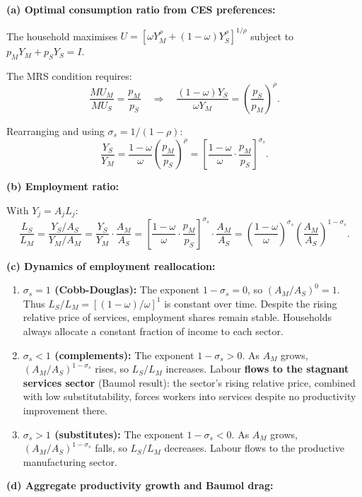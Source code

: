 \documentclass[a4paper,11pt]{article}
\begin{document}
\begin{answerbox}
\textbf{(a) Optimal consumption ratio from CES preferences:}

The household maximises $U = [\omega Y_M^\rho + (1-\omega)Y_S^\rho]^{1/\rho}$ subject to $p_M Y_M + p_S Y_S = I$.

The MRS condition requires:
\[
    \frac{MU_M}{MU_S} = \frac{p_M}{p_S}
    \quad\Longrightarrow\quad
    \frac{(1-\omega)Y_S}{\omega Y_M} = \left(\frac{p_S}{p_M}\right)^{\rho}.
\]

Rearranging and using $\sigma_s = 1/(1-\rho)$:
\[
    \frac{Y_S}{Y_M} = \frac{1-\omega}{\omega}\left(\frac{p_M}{p_S}\right)^{\rho}
    = \boxed{\left[\frac{1-\omega}{\omega}\cdot\frac{p_M}{p_S}\right]^{\sigma_s}.}
\]

\textbf{(b) Employment ratio:}

With $Y_j = A_j L_j$:
\[
    \frac{L_S}{L_M} = \frac{Y_S/A_S}{Y_M/A_M}
    = \frac{Y_S}{Y_M}\cdot\frac{A_M}{A_S}
    = \left[\frac{1-\omega}{\omega}\cdot\frac{p_M}{p_S}\right]^{\sigma_s}\cdot\frac{A_M}{A_S}
    = \boxed{\left(\frac{1-\omega}{\omega}\right)^{\sigma_s}\left(\frac{A_M}{A_S}\right)^{1-\sigma_s}.}
\]

\textbf{(c) Dynamics of employment reallocation:}

\begin{enumerate}[label=(\roman*), itemsep=3pt]
    \item \textbf{$\sigma_s = 1$ (Cobb-Douglas):} The exponent $1-\sigma_s = 0$, so $(A_M/A_S)^0 = 1$. Thus $L_S/L_M = [(1-\omega)/\omega]^1$ is constant over time. Despite the rising relative price of services, employment shares remain stable. Households always allocate a constant fraction of income to each sector.

    \item \textbf{$\sigma_s < 1$ (complements):} The exponent $1-\sigma_s > 0$. As $A_M$ grows, $(A_M/A_S)^{1-\sigma_s}$ rises, so $L_S/L_M$ increases. Labour \textbf{flows to the stagnant services sector} (Baumol result): the sector's rising relative price, combined with low substitutability, forces workers into services despite no productivity improvement there.

    \item \textbf{$\sigma_s > 1$ (substitutes):} The exponent $1-\sigma_s < 0$. As $A_M$ grows, $(A_M/A_S)^{1-\sigma_s}$ falls, so $L_S/L_M$ decreases. Labour flows to the productive manufacturing sector.
\end{enumerate}

\textbf{(d) Aggregate productivity growth and Baumol drag:}


\end{answerbox}
\end{document}
